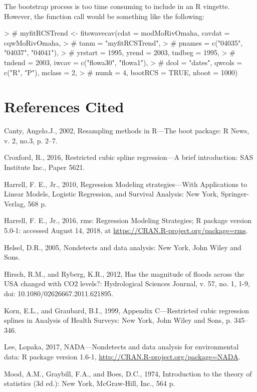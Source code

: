 \documentclass[11pt]{article}
\begin{document}
The bootstrap process is too time consuming to include in an R vingette. However, the function call would be something like the following:

\begin{Schunk}
\begin{Sinput}
> # myfitRCSTrend <- fitswavecav(cdat = modMoRivOmaha, cavdat = cqwMoRivOmaha,
> #                             tanm = "myfitRCSTrend", 
> #                             pnames = c("04035", "04037", "04041"), 
> #                             yrstart = 1995, yrend = 2003, tndbeg = 1995, 
> #                             tndend = 2003, iwcav = c("flowa30", "flowa1"), 
> #                             dcol = "dates", qwcols = c("R", "P"), mclass = 2, 
> #                             numk = 4, bootRCS = TRUE, nboot = 1000)
\end{Sinput}
\end{Schunk}


\section{References Cited}
Canty, Angelo.J., 2002, Resampling methods in R—The boot package: R News, v. 2, no.3, p. 2--7.

Croxford, R., 2016, Restricted cubic spline regression—A brief introduction: SAS Institute Inc., Paper 5621. 

Harrell, F. E., Jr., 2010, Regression Modeling strategies—With Applications to Linear Models, Logistic Regression, and Survival Analysis: New York, Springer-Verlag, 568 p.

Harrell, F. E., Jr., 2016, rms: Regression Modeling Strategies; R package version 5.0-1: accessed August 14, 2018, at \url{https://CRAN.R-project.org/package=rms}.

Helsel, D.R., 2005, Nondetects and data analysis: New York, John Wiley and Sons.

Hirsch, R.M., and Ryberg, K.R., 2012, Has the magnitude of floods across the USA changed with CO2 levels?: Hydrological Sciences Journal, v. 57, no. 1, 1-9, doi: 10.1080/02626667.2011.621895.

Korn, E.L., and Graubard, B.I., 1999, Appendix C—Restricted cubic regression splines in Analysis of Health Surveys: New York, John Wiley and Sons, p. 345–346.

Lee, Lopaka, 2017, NADA---Nondetects and data analysis for environmental data: R package version 1.6-1,
\url{http://CRAN.R-project.org/package=NADA}.

Mood, A.M., Graybill, F.A., and Boes, D.C., 1974, Introduction to the theory of statistics (3d ed.): New York, McGraw-Hill, Inc., 564 p.
\end{document}
